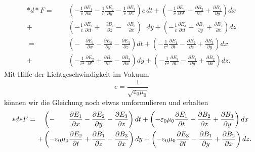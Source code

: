 \begin{align*}
	\ast d {\ast} F 
	= 
	\phantom{+} &\left( -\frac{1}{c}\frac{\partial E_1}{\partial x} -\frac{1}{c}\frac{\partial E_2}{\partial y} - \frac{1}{c}\frac{\partial E_3}{\partial z} \right) c \, dt +
	\left(-\frac{1}{c}\frac{\partial E_1}{\partial ct} - \frac{\partial B_2}{\partial z} + \frac{\partial B_3}{\partial y} \right) dx
	\\
	+ &\left( -\frac{1}{c}\frac{\partial E_2}{\partial ct} + \phantom{\frac{1}{c}} \frac{\partial B_1}{\partial z} - \phantom{\frac{1}{c}} \frac{\partial B_3}{\partial x} \right) \phantom{c \,}dy +
	\left( -\frac{1}{c}\frac{\partial E_3}{\partial ct} - \frac{\partial B_1}{\partial y} + \frac{\partial B_2}{\partial x} \right) dz
	\\[2ex]
	=
	\phantom{+} &\left( -\phantom{\frac{1}{c^2}}\frac{\partial E_1}{\partial x} -\frac{\partial E_2}{\partial y} - \frac{\partial E_3}{\partial z} \right) dt +
	\left(-\frac{1}{c^2}\frac{\partial E_1}{\partial t} - \frac{\partial B_2}{\partial z} + \frac{\partial B_3}{\partial y} \right) dx
	\\
	+ &\left( -\frac{1}{c^2}\frac{\partial E_2}{\partial t} + \frac{\partial B_1}{\partial z} - \frac{\partial B_3}{\partial x} \right) dy +
	\left( -\frac{1}{c^2}\frac{\partial E_3}{\partial t} - \frac{\partial B_1}{\partial y} + \frac{\partial B_2}{\partial x} \right) dz.
\end{align*}
Mit Hilfe der Lichtgeschwindigkeit im Vakuum 
\begin{equation*}
	c = \frac{1}{\sqrt{\varepsilon_0 \mu_0}}
\end{equation*}
können wir die Gleichung noch etwas umformulieren und erhalten
\begin{align}
	\ast d {\ast} F
	=
	\phantom{+} &\left( -\phantom{\varepsilon_0\mu_0}\frac{\partial E_1}{\partial x} -\frac{\partial E_2}{\partial y} - \frac{\partial E_3}{\partial z} \right) dt +
	\left(-\varepsilon_0\mu_0\frac{\partial E_1}{\partial t} - \frac{\partial B_2}{\partial z} + \frac{\partial B_3}{\partial y} \right) dx
	\label{maxwell:section:inhomogeneMaxwellgleichungen:linkeSeite}
	\\
	+ &\left( -\varepsilon_0\mu_0\frac{\partial E_2}{\partial t} + \frac{\partial B_1}{\partial z} - \frac{\partial B_3}{\partial x} \right) dy +
	\left( -\varepsilon_0\mu_0\frac{\partial E_3}{\partial t} - \frac{\partial B_1}{\partial y} + \frac{\partial B_2}{\partial x} \right) dz. \notag
\end{align}

